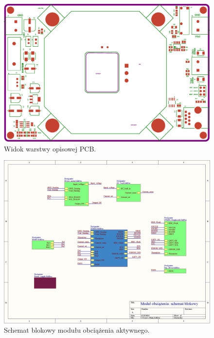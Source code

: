 \begin{figure}[h!]
    \begin{center}
        \includegraphics[width = 17cm]{zalaczniki/obciazenie/Obciążenie_aktywne_Strona_13.jpg}
        \caption{Widok warstwy opisowej PCB.}
    \end{center}
\end{figure}

\begin{figure}
    \begin{center}
        \includegraphics[width = 21cm]{zalaczniki/obciazenie/Obciążenie_aktywne_Strona_01.jpg}
        \caption{Schemat blokowy modułu obciążenia aktywnego.}
    \end{center}
\end{figure}

